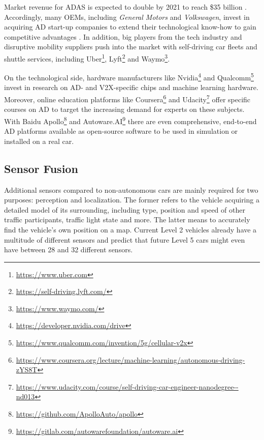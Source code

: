 Market revenue for ADAS is expected to double by 2021 to reach \$35 billion \cite{McKinseyCenterforFutureMobility2019}. Accordingly, many OEMs, including \textit{General Motors} and \textit{Volkswagen}, invest in acquiring AD start-up companies to extend their technological know-how to gain competitive advantages \cite{Korosec, Korosec2019}. In addition, big players from the tech industry and disruptive mobility suppliers push into the market with self-driving car fleets and shuttle services, including Uber\footnote{\url{https://www.uber.com}}, Lyft\footnote{\url{https://self-driving.lyft.com/}} and Waymo\footnote{\url{https://www.waymo.com/}}. 

On the technological side, hardware manufacturers like Nvidia\footnote{\url{https://developer.nvidia.com/drive}} and Qualcomm\footnote{\url{https://www.qualcomm.com/invention/5g/cellular-v2x}} invest in research on AD- and V2X-specific chips and machine learning hardware. Moreover, online education platforms like Coursera\footnote{\url{https://www.coursera.org/lecture/machine-learning/autonomous-driving-zYS8T}} and Udacity\footnote{\url{https://www.udacity.com/course/self-driving-car-engineer-nanodegree--nd013}} offer specific courses on AD to target the increasing demand for experts on these subjects. With Baidu Apollo\footnote{\url{https://github.com/ApolloAuto/apollo}} and Autoware.AI\footnote{\url{https://gitlab.com/autowarefoundation/autoware.ai}} there are even comprehensive, end-to-end AD platforms available as open-source software to be used in simulation or installed on a real car. 

\subsection{Sensor Fusion}
\label{subsec:background:sensor_fusion}
Additional sensors compared to non-autonomous cars are mainly required for two purposes: perception and localization. The former refers to the vehicle acquiring a detailed model of its surrounding, including type, position and speed of other traffic participants, traffic light state and more. The latter means to accurately find the vehicle's own position on a map. Current Level 2 vehicles already have a multitude of different sensors and \cite{Frost&SulivanConsulting2018} predict that future Level 5 cars might even have between 28 and 32 different sensors. 

